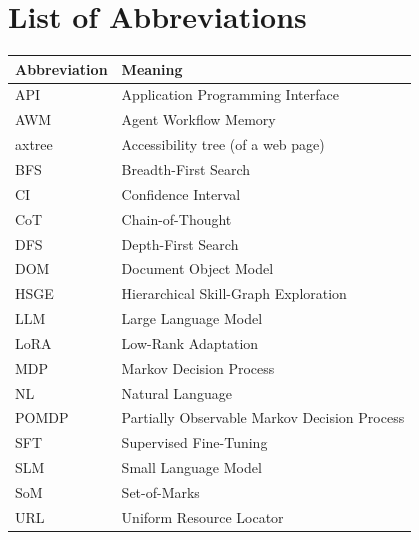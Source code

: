 \chapter*{List of Abbreviations}

\begin{longtable}{L{3.5cm} L{10.5cm}}
\toprule
\textbf{Abbreviation} & \textbf{Meaning} \\
\midrule
API & Application Programming Interface \\
AWM & Agent Workflow Memory \\
axtree & Accessibility tree (of a web page) \\
BFS & Breadth-First Search \\
CI & Confidence Interval \\
CoT & Chain-of-Thought \\
DFS & Depth-First Search \\
DOM & Document Object Model \\
HSGE & Hierarchical Skill-Graph Exploration \\
LLM & Large Language Model \\
LoRA & Low-Rank Adaptation \\
MDP & Markov Decision Process \\
NL & Natural Language \\
POMDP & Partially Observable Markov Decision Process \\
SFT & Supervised Fine-Tuning \\
SLM & Small Language Model \\
SoM & Set-of-Marks \\
URL & Uniform Resource Locator \\
\bottomrule
\end{longtable}
